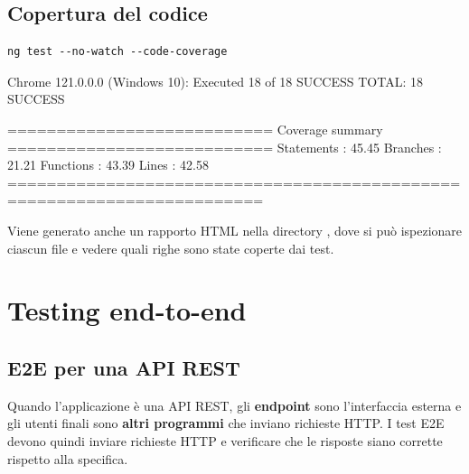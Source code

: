 \subsection{Copertura del codice}

\begin{lstlisting}[style=shell]
ng test --no-watch --code-coverage
\end{lstlisting}

\begin{console}[Terminale]
Chrome 121.0.0.0 (Windows 10): Executed 18 of 18 SUCCESS
TOTAL: 18 SUCCESS

=========================== Coverage summary ===========================
Statements   : 45.45%
Branches     : 21.21%
Functions    : 43.39%
Lines        : 42.58%
========================================================================
\end{console}

Viene generato anche un rapporto HTML nella directory , dove si
può ispezionare ciascun file e vedere quali righe sono state coperte dai test.


\section{Testing end-to-end}


\subsection{E2E per una API REST}

Quando l'applicazione è una API REST, gli \textbf{endpoint} sono l'interfaccia
esterna e gli utenti finali sono \textbf{altri programmi} che inviano richieste
HTTP. I test E2E devono quindi inviare richieste HTTP e verificare che le
risposte siano corrette rispetto alla specifica.


